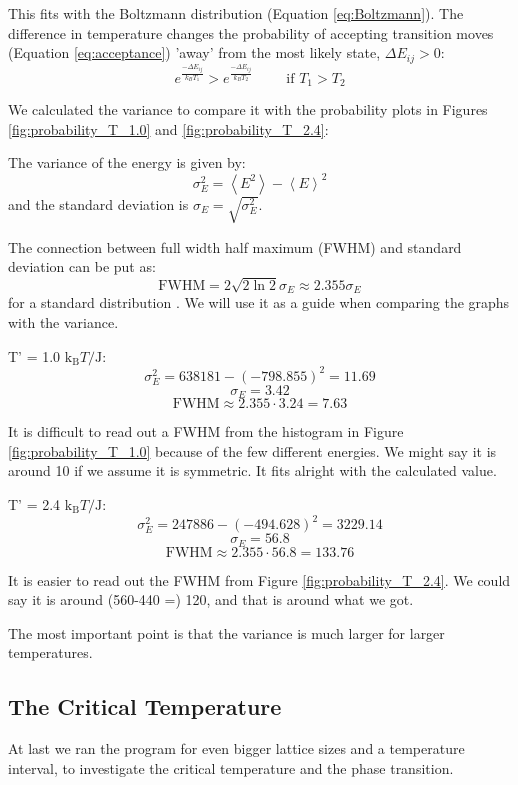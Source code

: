 This fits with the Boltzmann distribution (Equation \ref{eq:Boltzmann}). The difference in temperature changes the probability of accepting transition moves (Equation \ref{eq:acceptance}) 'away' from the most likely state, $ \Delta E_{ij} > 0$:
\[
e^\frac{-\Delta E_{ij}}{k_B T_1} > e^\frac{-\Delta E_{ij}}{k_B T_2}\hspace{1cm}\text{if } T_1 > T_2
\]

We calculated the variance to compare it with the probability plots in Figures \ref{fig:probability_T_1.0} and \ref{fig:probability_T_2.4}:

The variance of the energy is given by:
$$ \sigma_E^2 = \left< E^2\right> - \left< E\right>^2 $$
and the standard deviation is $\sigma_E = \sqrt{\sigma_E^2}$.

The connection between full width half maximum (FWHM) and standard deviation can be put as: 
$$\text{FWHM} = 2 \sqrt{2\ln 2} \sigma_E \approx 2.355 \sigma_E$$ 
for a standard distribution \cite{FWHM}. We will use it as a guide when comparing the graphs with the variance.

T' = 1.0 $\text{k}_\text{B}T/\text{J}$:
$$ \sigma_E^2 = 638181 - (-798.855)^2 = 11.69 $$
$$ \sigma_E = 3.42 $$
$$ \text{FWHM} \approx 2.355 \cdot 3.24 = 7.63 $$

It is difficult to read out a FWHM from the histogram in Figure \ref{fig:probability_T_1.0} because of the few different energies. We might say it is around 10 if we assume it is symmetric. It fits alright with the calculated value. 

T' = 2.4 $\text{k}_\text{B}T/\text{J}$:
$$ \sigma_E^2 =   247886 - (-494.628)^2 = 3229.14 $$
$$ \sigma_E = 56.8  $$
$$ \text{FWHM} \approx 2.355 \cdot 56.8 = 133.76 $$

It is easier to read out the FWHM from Figure \ref{fig:probability_T_2.4}. We could say it is around (560-440 =) 120, and that is around what we got.

The most important point is that the variance is much larger for larger temperatures. 

\subsection{The Critical Temperature}

At last we ran the program for even bigger lattice sizes and a temperature interval, to investigate the critical temperature and the phase transition.

